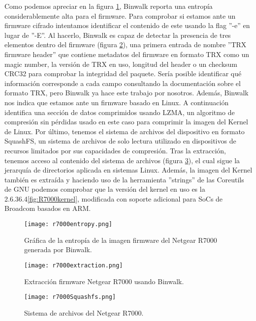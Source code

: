 Como podemos apreciar en la figura \ref{fig:binwalkEnt}, Binwalk reporta una entropía considerablemente alta para el firmware. Para comprobar si estamos
ante un firmware cifrado intentamos identificar el contenido de este usando la flag ''-e'' en lugar de ''-E''. Al hacerlo, Binwalk es capaz de detectar 
la presencia de tres elementos dentro del firmware (figura \ref{fig:binwalkExt}), una primera entrada de nombre ''TRX firmware header'' que contiene metadatos
del firmware en formato TRX como un magic number, la versión de TRX en uso, longitud del header o un checksum CRC32 para comprobar la integridad del paquete. Sería posible
identificar qué información corresponde a cada campo consultando la documentación sobre el formato TRX\cite{firmwareFormat}, pero Binwalk ya hace este trabajo 
por nosotros. Además, Binwalk nos indica que estamos ante un firmware basado en Linux. A continuación identifica una sección de datos comprimidos usando LZMA, un algoritmo
de compresión sin pérdidas usado en este caso para comprimir la imagen del Kernel de Linux. Por último, tenemos el sistema de archivos del dispositivo en formato
SquashFS, un sistema de archivos de solo lectura utilizado en dispositivos de recursos limitados por sus capacidades de compresión. Tras la extracción, tenemos acceso 
al contenido del sistema de archivos (figura \ref{fig:R7000squashfs}), el cual sigue la jerarquía de directorios aplicada en sistemas Linux. Además, la imagen 
del Kernel también es extraída y haciendo uso de la herramienta ''strings'' de las Coreutils de GNU podemos comprobar que la versión del kernel en uso es la 
2.6.36.4\ref{fig:R7000kernel}, modificada con soporte adicional para SoCs de Broadcom basados en ARM.

\begin{figure}[H]
    \centering
    \texttt{[image: r7000entropy.png]}
    \caption{Gráfica de la entropía de la imagen firmware del Netgear R7000 generada por Binwalk.}
    \label{fig:binwalkEnt}
\end{figure}

\begin{figure}[H]
    \centering
    \texttt{[image: r7000extraction.png]}
    \caption{Extracción firmware Netgear R7000 usando Binwalk.}
    \label{fig:binwalkExt}
\end{figure}

\begin{figure}[H]
    \centering
    \texttt{[image: r7000Squashfs.png]}
    \caption{Sistema de archivos del Netgear R7000.}
    \label{fig:R7000squashfs}
\end{figure}

